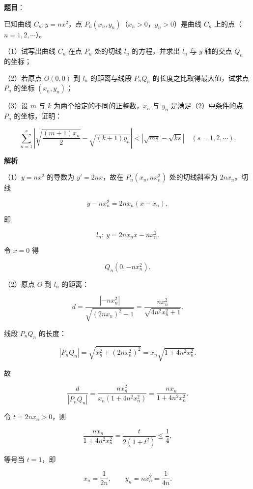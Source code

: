 \begin{answer}

\textbf{题目}：

已知曲线 $C_n:y=nx^2$，点 $P_n(x_n,y_n)$（$x_n>0$，$y_n>0$）是曲线 $C_n$ 上的点（$n=1,2,\cdots$）。

（1）试写出曲线 $C_n$ 在点 $P_n$ 处的切线 $l_n$ 的方程，并求出 $l_n$ 与 $y$ 轴的交点 $Q_n$ 的坐标；

（2）若原点 $O(0,0)$ 到 $l_n$ 的距离与线段 $P_nQ_n$ 的长度之比取得最大值，试求点 $P_n$ 的坐标 $(x_n,y_n)$；

（3）设 $m$ 与 $k$ 为两个给定的不同的正整数，$x_n$ 与 $y_n$ 是满足（2）中条件的点 $P_n$ 的坐标，证明：

\nopagebreak[4]
\[\sum_{n=1}^s\left|\sqrt{\frac{(m+1)x_n}{2}}-\sqrt{(k+1)y_n}\right|<\left|\sqrt{ms}-\sqrt{ks}\right|\quad(s=1,2,\cdots).\]

\textbf{解析}

（1）$y=nx^2$ 的导数为 $y'=2nx$，故在 $P_n(x_n,nx_n^2)$ 处的切线斜率为 $2nx_n$。切线

\nopagebreak[4]
\[y-nx_n^2=2nx_n(x-x_n),\]

即

\nopagebreak[4]
\[l_n:\ y=2nx_nx-nx_n^2.\]

令 $x=0$ 得

\nopagebreak[4]
\[Q_n(0,-nx_n^2).\]

（2）原点 $O$ 到 $l_n$ 的距离：

\nopagebreak[4]
\[d=\frac{|{-nx_n^2}|}{\sqrt{(2nx_n)^2+1}}
=\frac{nx_n^2}{\sqrt{4n^2x_n^2+1}}.\]

线段 $P_nQ_n$ 的长度：

\nopagebreak[4]
\[|P_nQ_n|=\sqrt{x_n^2+(2nx_n^2)^2}
=x_n\sqrt{1+4n^2x_n^2}.\]

故

\nopagebreak[4]
\[\frac d{|P_nQ_n|}
=\frac{nx_n^2}{x_n(1+4n^2x_n^2)}
=\frac{nx_n}{1+4n^2x_n^2}.\]

令 $t=2nx_n>0$，则

\nopagebreak[4]
\[\frac{nx_n}{1+4n^2x_n^2}
=\frac{t}{2(1+t^2)}\leqslant\frac14,\]

等号当 $t=1$，即

\nopagebreak[4]
\[x_n=\frac1{2n},\qquad y_n=nx_n^2=\frac1{4n}.\]


\end{answer}
